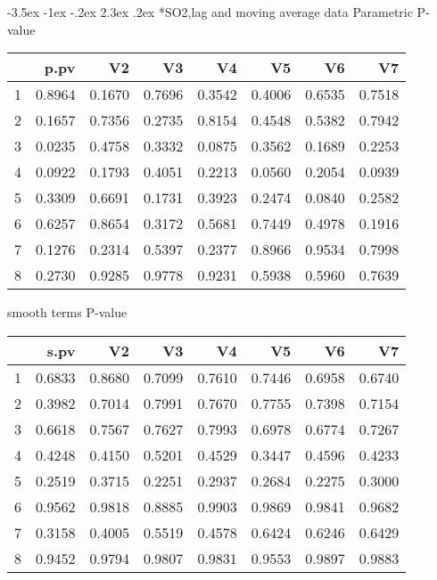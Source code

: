 \documentclass[a4paper, 12pt]{article}
\makeatletter
\def\Large{\fontsize{16}{24}\selectfont}
\renewcommand\section{\@startsection {section}{1}{\z@}%
                                   {-3.5ex \@plus -1ex \@minus -.2ex}%
                                   {2.3ex \@plus.2ex}%
                                   {\centering\normalfont\Large\bfseries}}
\makeatother
\begin{document}
\section*{SO2,lag and moving average data}
Parametric P-value
\begin{table}[ht]
\centering
\begin{tabular}{rrrrrrrr}
  \hline
 & p.pv & V2 & V3 & V4 & V5 & V6 & V7 \\
  \hline
1 & 0.8964 & 0.1670 & 0.7696 & 0.3542 & 0.4006 & 0.6535 & 0.7518 \\
  2 & 0.1657 & 0.7356 & 0.2735 & 0.8154 & 0.4548 & 0.5382 & 0.7942 \\
  3 & 0.0235 & 0.4758 & 0.3332 & 0.0875 & 0.3562 & 0.1689 & 0.2253 \\
  4 & 0.0922 & 0.1793 & 0.4051 & 0.2213 & 0.0560 & 0.2054 & 0.0939 \\
  5 & 0.3309 & 0.6691 & 0.1731 & 0.3923 & 0.2474 & 0.0840 & 0.2582 \\
  6 & 0.6257 & 0.8654 & 0.3172 & 0.5681 & 0.7449 & 0.4978 & 0.1916 \\
  7 & 0.1276 & 0.2314 & 0.5397 & 0.2377 & 0.8966 & 0.9534 & 0.7998 \\
  8 & 0.2730 & 0.9285 & 0.9778 & 0.9231 & 0.5938 & 0.5960 & 0.7639 \\
   \hline
\end{tabular}
\end{table}

smooth terms P-value
\begin{table}[ht]
\centering
\begin{tabular}{rrrrrrrr}
  \hline
 & s.pv & V2 & V3 & V4 & V5 & V6 & V7 \\
  \hline
1 & 0.6833 & 0.8680 & 0.7099 & 0.7610 & 0.7446 & 0.6958 & 0.6740 \\
  2 & 0.3982 & 0.7014 & 0.7991 & 0.7670 & 0.7755 & 0.7398 & 0.7154 \\
  3 & 0.6618 & 0.7567 & 0.7627 & 0.7993 & 0.6978 & 0.6774 & 0.7267 \\
  4 & 0.4248 & 0.4150 & 0.5201 & 0.4529 & 0.3447 & 0.4596 & 0.4233 \\
  5 & 0.2519 & 0.3715 & 0.2251 & 0.2937 & 0.2684 & 0.2275 & 0.3000 \\
  6 & 0.9562 & 0.9818 & 0.8885 & 0.9903 & 0.9869 & 0.9841 & 0.9682 \\
  7 & 0.3158 & 0.4005 & 0.5519 & 0.4578 & 0.6424 & 0.6246 & 0.6429 \\
  8 & 0.9452 & 0.9794 & 0.9807 & 0.9831 & 0.9553 & 0.9897 & 0.9883 \\
   \hline
\end{tabular}
\end{table}
\end{document}
